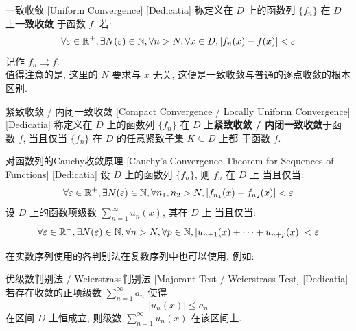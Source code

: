         \begin{dfn}
            {一致收敛}
            [Uniform Convergence]
            [Dedicatia]
            称定义在 \(D\) 上的函数列 \(\{f_n\}\) 在 \(D\) 上\textbf{一致收敛} 于函数 \(f\), 若: 
            \[\forall\varepsilon\in\operatorname{\mathbb{R}}^+, \exists N(\varepsilon)\in\operatorname{\mathbb{N}}, \forall n>N, \forall x\in D, |f_n(x)-f(x)|<\varepsilon\]
            记作 \(f_n\rightrightarrows f\).\\
            值得注意的是, 这里的 \(N\) 要求与 \(x\) 无关, 这便是一致收敛与普通的逐点收敛的根本区别. 
        \end{dfn}

        \begin{dfn}
            {紧致收敛 / 内闭一致收敛}
            [Compact Convergence / Locally Uniform Convergence]
            [Dedicatia]
            称定义在 \(D\) 上的函数列 \(\{f_n\}\) 在 \(D\) 上\textbf{紧致收敛 / 内闭一致收敛}于函数 \(f\), 当且仅当 \(\{f_n\}\) 在 \(D\) 的任意紧致子集 \(K\subseteq D\) 上都\UniformConvergent{} 于函数 \(f\).
        \end{dfn}

        \begin{crl}
            {对函数列的Cauchy收敛原理}
            [Cauchy's Convergence Theorem for Sequences of Functions]
            [Dedicatia]
            设 \(D\) 上的函数列 \(\{f_n\}\), 则 \(f_n\) 在 \(D\) 上\UniformConvergent{} 当且仅当: 
            \[\forall\varepsilon\in\operatorname{\mathbb{R}}^+, \exists N(\varepsilon)\in\operatorname{\mathbb{N}}, \forall n_1,n_2>N, |f_{n_1}(x)-f_{n_2}(x)|<\varepsilon\]
            设 \(D\) 上的函数项级数 \(\sum_{n=1}^{\infty} u_n(x)\), 其在 \(D\) 上\UniformConvergent{} 当且仅当: 
            \[\forall\varepsilon\in\operatorname{\mathbb{R}}^+, \exists N(\varepsilon)\in\operatorname{\mathbb{N}}, \forall n>N, \forall p\in\operatorname{\mathbb{N}}, |u_{n+1}(x)+\cdots+u_{n+p}(x)|<\varepsilon\]
        \end{crl}

        在实数序列使用的各判别法在复数序列中也可以使用. 例如:

        \begin{thm}
            {优级数判别法 / Weierstrass判别法}
            [Majorant Test / Weierstrass Test]
            [Dedicatia]
            若存在收敛的正项级数 \(\sum_{n = 1}^{\infty} a_n \) 使得\[|u_n(x)|\leqslant a_n\]
            在区间 \(D\) 上恒成立, 则级数 \(\sum_{n = 1}^{\infty} u_n(x) \) 在该区间上\UniformConvergent{}. 
        \end{thm}
    
